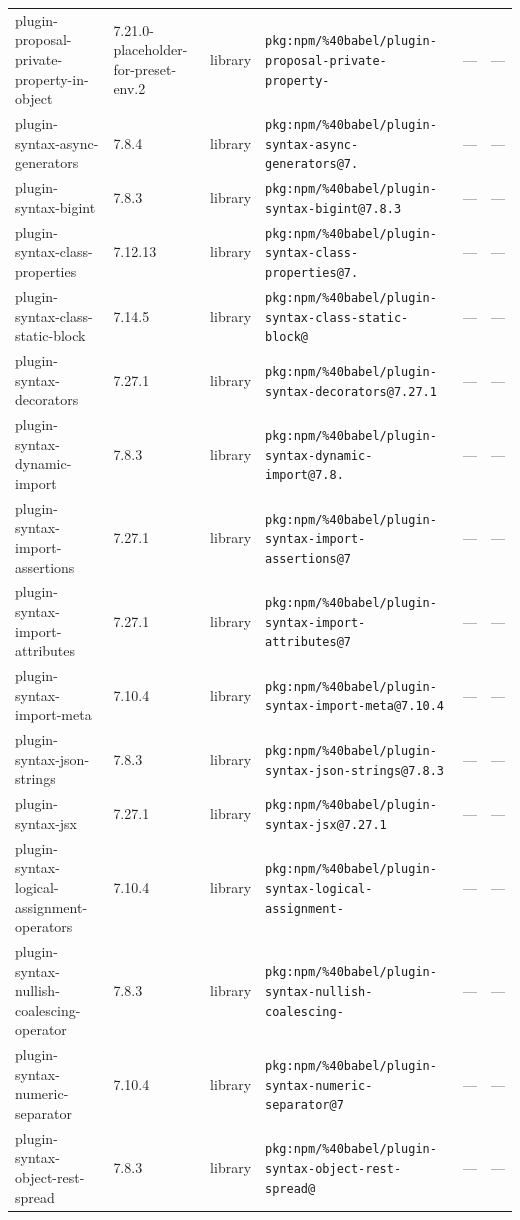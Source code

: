 \documentclass[11pt]{article}
\begin{document}
\begin{longtable}{|l|l|l|p{2.2cm}|l|p{4cm}|}
plugin-proposal-private-property-in-object & 7.21.0-placeholder-for-preset-env.2 & library & \texttt{pkg:npm/\%40babel/plugin-proposal-private-property-} & — & — \\
plugin-syntax-async-generators & 7.8.4 & library & \texttt{pkg:npm/\%40babel/plugin-syntax-async-generators@7.} & — & — \\
plugin-syntax-bigint & 7.8.3 & library & \texttt{pkg:npm/\%40babel/plugin-syntax-bigint@7.8.3} & — & — \\
plugin-syntax-class-properties & 7.12.13 & library & \texttt{pkg:npm/\%40babel/plugin-syntax-class-properties@7.} & — & — \\
plugin-syntax-class-static-block & 7.14.5 & library & \texttt{pkg:npm/\%40babel/plugin-syntax-class-static-block@} & — & — \\
plugin-syntax-decorators & 7.27.1 & library & \texttt{pkg:npm/\%40babel/plugin-syntax-decorators@7.27.1} & — & — \\
plugin-syntax-dynamic-import & 7.8.3 & library & \texttt{pkg:npm/\%40babel/plugin-syntax-dynamic-import@7.8.} & — & — \\
plugin-syntax-import-assertions & 7.27.1 & library & \texttt{pkg:npm/\%40babel/plugin-syntax-import-assertions@7} & — & — \\
plugin-syntax-import-attributes & 7.27.1 & library & \texttt{pkg:npm/\%40babel/plugin-syntax-import-attributes@7} & — & — \\
plugin-syntax-import-meta & 7.10.4 & library & \texttt{pkg:npm/\%40babel/plugin-syntax-import-meta@7.10.4} & — & — \\
plugin-syntax-json-strings & 7.8.3 & library & \texttt{pkg:npm/\%40babel/plugin-syntax-json-strings@7.8.3} & — & — \\
plugin-syntax-jsx & 7.27.1 & library & \texttt{pkg:npm/\%40babel/plugin-syntax-jsx@7.27.1} & — & — \\
plugin-syntax-logical-assignment-operators & 7.10.4 & library & \texttt{pkg:npm/\%40babel/plugin-syntax-logical-assignment-} & — & — \\
plugin-syntax-nullish-coalescing-operator & 7.8.3 & library & \texttt{pkg:npm/\%40babel/plugin-syntax-nullish-coalescing-} & — & — \\
plugin-syntax-numeric-separator & 7.10.4 & library & \texttt{pkg:npm/\%40babel/plugin-syntax-numeric-separator@7} & — & — \\
plugin-syntax-object-rest-spread & 7.8.3 & library & \texttt{pkg:npm/\%40babel/plugin-syntax-object-rest-spread@} & — & — \\

\end{longtable}
\end{document}
